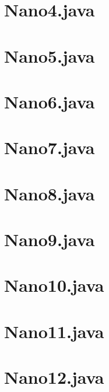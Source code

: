 \documentclass[12pt,a4paper,twoside]{report}
\begin{document}
\section{Nano4.java}

\section{Nano5.java}

\section{Nano6.java}

\section{Nano7.java}

\section{Nano8.java}

\section{Nano9.java}

\section{Nano10.java}

\section{Nano11.java}

\section{Nano12.java}

\end{document}
